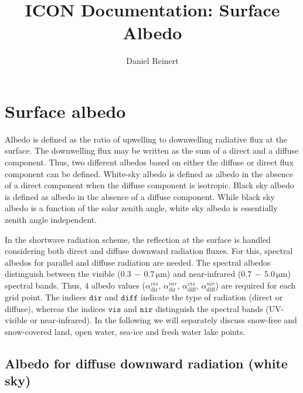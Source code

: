 \documentclass[a4paper,11pt]{article}
\author{Daniel Reinert}
\title{ICON Documentation: Surface Albedo}
\begin{document}
  \maketitle



\section{Surface albedo}
Albedo is defined as the ratio of upwelling to downwelling radiative flux at the surface. The downwelling flux may be written as the sum of a direct and a diffuse component. Thus, two 
different albedos based on either the diffuse or direct flux component can be defined. White-sky albedo is defined as albedo in the absence of a direct component when the diffuse 
component is isotropic. Black sky albedo is defined as albedo in the absence of a diffuse component. While black sky albedo is a function of the solar zenith angle, white sky albedo 
is essentially zenith angle independent.

In the shortwave radiation scheme, the reflection at the surface is handled considering both direct and diffuse downward radiation fluxes. For this, spectral albedos for parallel and 
diffuse radiation are needed. The spectral albedos distinguish between the visible ($0.3\,-\,0.7\,\mathrm{\mu m}$) and near-infrared ($0.7\,-\,5.0\,\mathrm{\mu m}$) spectral bands. Thus, 
$4$ albedo values ($\alpha_{\mathrm{dir}}^{vis}$, $\alpha_{\mathrm{dir}}^{nir}$, $\alpha_{\mathrm{diff}}^{vis}$, $\alpha_{\mathrm{diff}}^{nir}$) are required for each grid point. The 
indices $\mathtt{dir}$ and $\mathtt{diff}$ indicate the type of radiation (direct or diffuse), whereas the indices $\mathtt{vis}$ and $\mathtt{nir}$ distinguish the spectral bands 
(UV-visible or near-infrared). In the following we will separately discuss snow-free and snow-covered land, open water, sea-ice and fresh water lake points.


\subsection{Albedo for diffuse downward radiation (white sky)}
\end{document}
